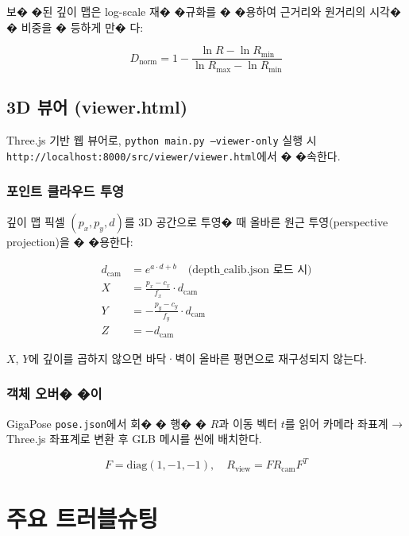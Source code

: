 \documentclass[a4paper,12pt]{article}
\begin{document}
보� �된 깊이 맵은 log-scale 재� �규화를 � �용하여 근거리와 원거리의 시각� � 비중을 � 등하게 만� 다:

\begin{equation}
  D_{\text{norm}} = 1 - \frac{\ln R - \ln R_{\min}}{\ln R_{\max} - \ln R_{\min}}
\end{equation}

\subsection{3D 뷰어 (viewer.html)}

Three.js 기반 웹 뷰어로, \texttt{python main.py --viewer-only} 실행 시
\texttt{http://localhost:8000/src/viewer/viewer.html}에서 � �속한다.

\subsubsection{포인트 클라우드 투영}

깊이 맵 픽셀 $(p_x, p_y, d)$를 3D 공간으로 투영�  때
올바른 원근 투영(perspective projection)을 � �용한다:

\begin{align}
  d_{\text{cam}} &= e^{a \cdot d + b} \quad \text{(depth\_calib.json 로드 시)} \\
  X &= \frac{p_x - c_x}{f_x} \cdot d_{\text{cam}} \\
  Y &= -\frac{p_y - c_y}{f_y} \cdot d_{\text{cam}} \\
  Z &= -d_{\text{cam}}
\end{align}

$X$, $Y$에 깊이를 곱하지 않으면 바닥·벽이 올바른 평면으로 재구성되지 않는다.

\subsubsection{객체 오버� �이}

GigaPose \texttt{pose.json}에서 회� � 행� � $R$과 이동 벡터 $t$를 읽어
카메라 좌표계 → Three.js 좌표계로 변환 후 GLB 메시를 씬에 배치한다.

\begin{equation}
  F = \mathrm{diag}(1, -1, -1), \quad R_{\text{view}} = F R_{\text{cam}} F^T
\end{equation}

\section{주요 트러블슈팅}
\end{document}
